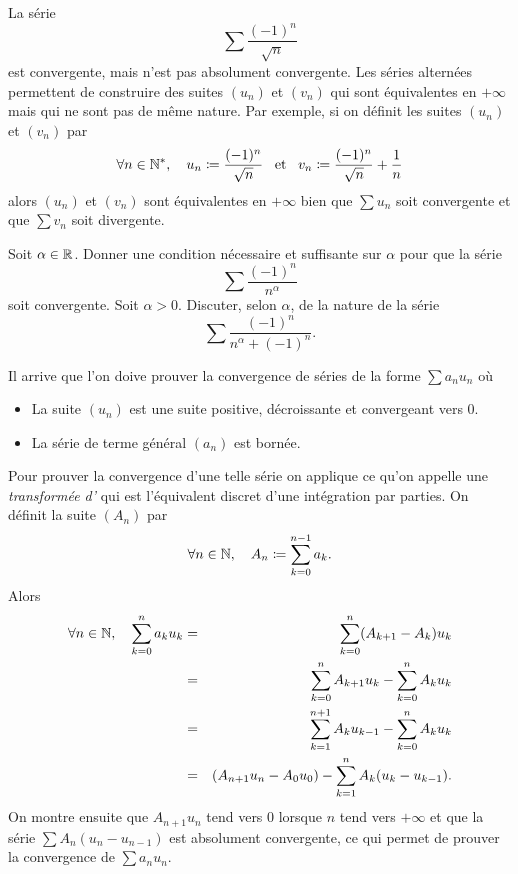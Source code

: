\documentclass{magnolia}
\begin{document}
\begin{remarques}
\remarque La série
  \[\sum \frac{(-1)^n}{\sqrt{n}}\]
  est convergente, mais n'est pas absolument convergente.
\remarque Les séries alternées permettent de construire des suites $(u_n)$ et $(v_n)$
  qui sont équivalentes en $+\infty$ mais qui ne sont pas de même nature. Par exemple,
  si on définit les suites $(u_n)$ et $(v_n)$ par
  \[\forall n\in{\mathbb{N}^*},\quad u_n\coloneqq\frac{(-1)^n}{\sqrt{n}} \quad\!\text{et}\quad\!
    v_n\coloneqq\frac{(-1)^n}{\sqrt{n}}+\frac{1}{n}\]
  alors $(u_n)$ et $(v_n)$ sont équivalentes en $+\infty$ bien que $\sum u_n$ soit convergente
  et que $\sum v_n$ soit divergente.
\end{remarques}

\begin{exos}
\exo Soit $\alpha\in\mathbb{R}$. Donner une condition nécessaire et suffisante sur $\alpha$ pour que
  la série
  \[\sum \frac{(-1)^n}{n^\alpha}\]
  soit convergente.
\exo Soit $\alpha>0$. Discuter, selon $\alpha$, de la nature de la série
  \[\sum \frac{(-1)^n}{n^\alpha + (-1)^n}.\]
\end{exos}

\begin{remarqueUnique}
\remarque Il arrive que l'on doive prouver la convergence de séries de la forme
  $\sum a_n u_n$ où
  \begin{itemize}
  \item La suite $(u_n)$ est une suite positive, décroissante et convergeant vers 0.
  \item La série de terme général $(a_n)$ est bornée.
  \end{itemize}
  Pour prouver la convergence d'une telle série on applique ce qu'on appelle une
  \emph{transformée d'} qui est l'équivalent discret d'une intégration par
  parties. On définit la suite $(A_n)$ par
  \[\forall n\in\mathbb{N},\quad A_n\coloneqq\sum_{k=0}^{n-1} a_k.\]
  Alors
  \begin{eqnarray*}
  \forall n\in\mathbb{N},\quad
  \sum_{k=0}^n a_k u_k
  &=& \sum_{k=0}^n (A_{k+1} - A_k)u_k\\
  &=& \sum_{k=0}^n A_{k+1} u_k  - \sum_{k=0}^n A_k u_k\\
  &=& \sum_{k=1}^{n+1} A_k u_{k-1}  - \sum_{k=0}^n A_k u_k\\
  &=& \left(A_{n+1} u_n - A_0 u_0\right) - \sum_{k=1}^n A_k (u_{k}-u_{k-1}).
  \end{eqnarray*}
  On montre ensuite que $A_{n+1} u_n$ tend vers 0 lorsque $n$ tend vers $+\infty$ et
  que la série $\sum A_n(u_n - u_{n-1})$ est absolument convergente, ce qui permet de prouver
  la convergence de $\sum a_n u_n$.
\end{remarqueUnique}
\end{document}
